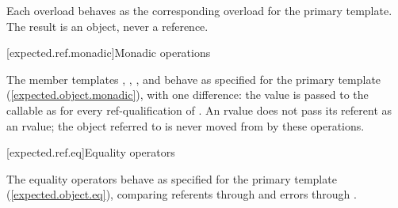 \begin{addedblock}
\begin{itemdescr}
\pnum
\returns
Each overload behaves as the corresponding overload for the primary template.
The result is an object, never a reference.
\end{itemdescr}

[expected.ref.monadic]{Monadic operations}

\pnum
The member templates , , , and
 behave as specified for the primary template
(\ref{expected.object.monadic}), with one difference: the value is passed to
the callable as  for every ref-qualification of . An
rvalue  does not pass its referent as an rvalue; the
object referred to is never moved from by these operations.

[expected.ref.eq]{Equality operators}

\pnum
The equality operators behave as specified for the primary template
(\ref{expected.object.eq}), comparing referents through  and
errors through .
\end{addedblock}

